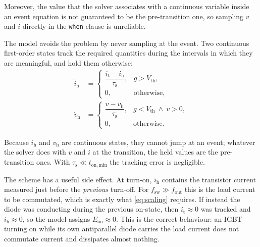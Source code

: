 \documentclass[11pt,a4paper]{article}
\newcommand{\code}[1]{\texttt{\small #1}}
\begin{document}
Moreover, the value that the solver associates with a continuous variable inside
an event equation is not guaranteed to be the pre-transition one, so sampling
$v$ and $i$ directly in the \code{when} clause is unreliable.

The model avoids the problem by never sampling at the event. Two continuous
first-order states track the required quantities during the intervals in which
they are meaningful, and hold them otherwise:
\begin{align}
  \dot{i}_\mathrm{h} &=
  \begin{cases}
    \dfrac{i_\mathrm{t} - i_\mathrm{h}}{\tau_\mathrm{s}}, & g > V_\mathrm{th},\\[2mm]
    0, & \text{otherwise},
  \end{cases}
  \label{eq:ih}\\[2mm]
  \dot{v}_\mathrm{h} &=
  \begin{cases}
    \dfrac{v - v_\mathrm{h}}{\tau_\mathrm{s}}, & g < V_\mathrm{th} \ \wedge\ v > 0,\\[2mm]
    0, & \text{otherwise}.
  \end{cases}
  \label{eq:vh}
\end{align}

Because $i_\mathrm{h}$ and $v_\mathrm{h}$ are continuous states, they cannot jump
at an event; whatever the solver does with $v$ and $i$ at the transition, the
held values are the pre-transition ones. With
$\tau_\mathrm{s} \ll t_\mathrm{on,min}$ the tracking error is negligible.

The scheme has a useful side effect. At turn-on, $i_\mathrm{h}$ contains the
transistor current measured just before the \emph{previous} turn-off. For
$f_\mathrm{sw} \gg f_\mathrm{out}$ this is the load current to be commutated,
which is exactly what \eqref{eq:scaling} requires. If instead the diode was
conducting during the previous on-state, then $i_\mathrm{t} \approx 0$ was
tracked and $i_\mathrm{h} \approx 0$, so the model assigns
$E_\mathrm{on} \approx 0$. This is the correct behaviour: an IGBT turning on
while its own antiparallel diode carries the load current does not commutate
current and dissipates almost nothing.
\end{document}
